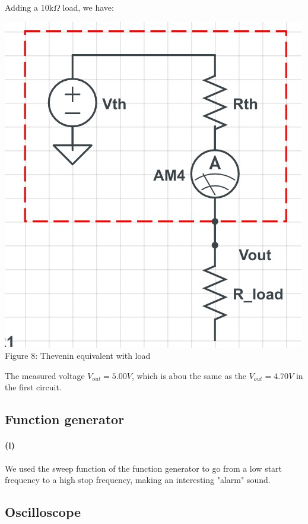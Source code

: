 \documentclass[]{article}
\begin{document}
	Adding a 10k$\Omega$ load, we have: 
	\begin{center} 
		\includegraphics[scale=0.3]{lab1_thev3}\\			
		Figure 8: Thevenin equivalent with load
	\end{center}
The measured voltage $V_{out}=5.00V$, which is abou the same as the $V_{out}=4.70V$ in the first circuit.
\subsection*{Function generator}	
	\paragraph{ (l)}
	We used the sweep function of the function generator to go from a low start frequency to a high stop frequency, making an interesting "alarm" sound.
\subsection*{Oscilloscope}	
\end{document}
